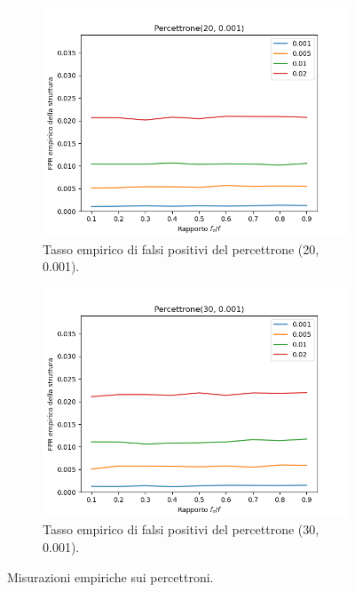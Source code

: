 \documentclass[../../main.tex]{subfiles}
\begin{document}
\begin{figure}[H]
\begin{subfigure}[b]{0.49\textwidth}
            \label{fig:LBFFNRPercettrone30}
        \end{subfigure}
        \begin{subfigure}[b]{0.49\textwidth}
            \centering
            \includegraphics[width = \textwidth]{immagini/7/LBF/Percettrone(20, 0.001)_FPR.png}
            \caption{Tasso empirico di falsi positivi del percettrone (20, 0.001).}
            \label{fig:LBFFPRPercettrone20}
        \end{subfigure}
        \begin{subfigure}[b]{0.49\textwidth}
            \centering
            \includegraphics[width = \textwidth]{immagini/7/LBF/Percettrone(30, 0.001)_FPR.png}
            \caption{Tasso empirico di falsi positivi del percettrone (30, 0.001).}
            \label{fig:LBFFPRPercettrone30}
        \end{subfigure}
        \caption{Misurazioni empiriche sui percettroni.}
        \label{fig:percettroneEmpiricoLBF}
    \end{figure}
\end{document}
